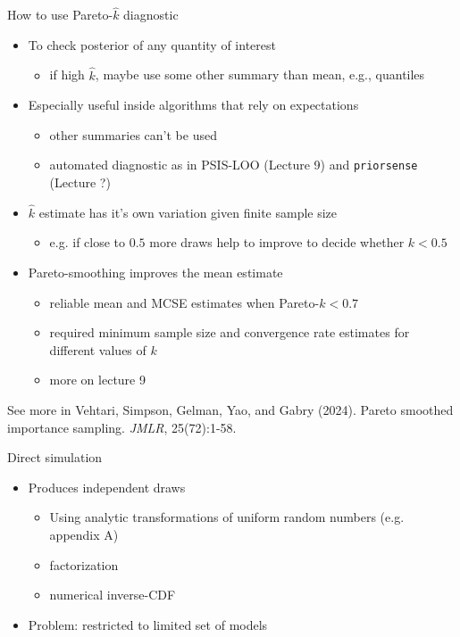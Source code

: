 \documentclass[english,t]{beamer}
\begin{document}
\begin{frame}{How to use Pareto-$\hat{k}$ diagnostic}


  \begin{itemize}
  \item<+-> To check posterior of any quantity of interest
    \begin{itemize}
    \item if high $\hat{k}$, maybe use some other summary than mean,
      e.g., quantiles
    \end{itemize}
  \item<+-> Especially useful inside algorithms that rely on
    expectations
    \begin{itemize}
    \item other summaries can't be used
    \item automated diagnostic as in PSIS-LOO (Lecture 9) and \texttt{priorsense} (Lecture ?)
    \end{itemize}
  \item<+-> $\hat{k}$ estimate has it's own variation given finite sample size
    \begin{itemize}
    \item e.g. if close to $0.5$ more draws help to improve to decide
      whether $k<0.5$
    \end{itemize}
  \item<+-> Pareto-smoothing improves the mean estimate
    \begin{itemize}
    \item reliable mean and MCSE estimates when Pareto-$k<0.7$
    \item required minimum sample size and convergence rate estimates
      for different values of $k$
    \item more on lecture 9
    \end{itemize}
  \end{itemize}

  \vfill
  {\small\color{gray}
  See more in Vehtari, Simpson, Gelman, Yao, and Gabry (2024). Pareto
  smoothed importance sampling. \textit{JMLR}, 25(72):1-58.}
  
\end{frame}


\begin{frame}{Direct simulation}

  \begin{itemize}
  \item Produces independent draws
    \begin{itemize}
    \item Using analytic transformations of uniform random numbers
      (e.g. appendix A)
    \item factorization
    \item numerical inverse-CDF
    \end{itemize}
  \item Problem: restricted to limited set of models
  \end{itemize}

\end{frame}
\end{document}
